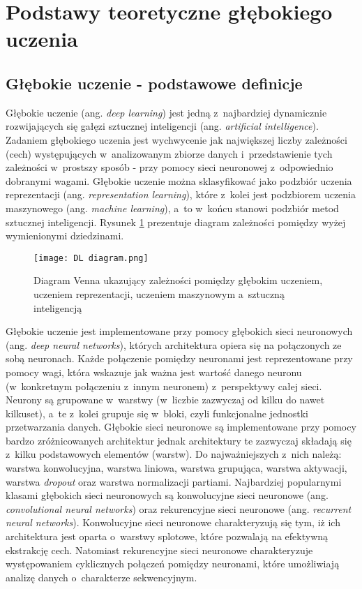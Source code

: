 \section{Podstawy teoretyczne głębokiego uczenia}

\subsection{Głębokie uczenie - podstawowe definicje}

Głębokie uczenie (ang. \emph{deep learning}) jest jedną z~najbardziej dynamicznie rozwijających się gałęzi sztucznej inteligencji (ang. \emph{artificial intelligence}). Zadaniem głębokiego uczenia jest wychwycenie jak największej liczby zależności (cech) występujących w~analizowanym zbiorze danych i~przedstawienie tych zależności w~prostszy sposób - przy pomocy sieci neuronowej z~odpowiednio dobranymi wagami. Głębokie uczenie można sklasyfikować jako podzbiór uczenia reprezentacji (ang. \emph{representation learning}), które z~kolei jest podzbiorem uczenia maszynowego (ang. \emph{machine learning}), a~to w~końcu stanowi podzbiór metod sztucznej inteligencji. Rysunek \ref{fig:diagram1} prezentuje diagram zależności pomiędzy wyżej wymienionymi dziedzinami.

\begin{figure}[!h]
    \centering \texttt{[image: DL diagram.png]}
    \captionsetup{format=hang}
    \caption{Diagram Venna ukazujący zależności pomiędzy głębokim uczeniem, uczeniem reprezentacji, uczeniem maszynowym a~sztuczną inteligencją \cite{goodfellow}}
    \label{fig:diagram1}
\end{figure}

Głębokie uczenie jest implementowane przy pomocy głębokich sieci neuronowych (ang. \emph{deep neural networks}), których architektura opiera się na połączonych ze sobą neuronach. Każde połączenie pomiędzy neuronami jest reprezentowane przy pomocy wagi, która wskazuje jak ważna jest wartość danego neuronu (w~konkretnym połączeniu z~innym neuronem) z~perspektywy całej sieci. Neurony są grupowane w~warstwy (w~liczbie zazwyczaj od kilku do nawet kilkuset), a~te z~kolei grupuje się w~bloki, czyli funkcjonalne jednostki przetwarzania danych. Głębokie sieci neuronowe są implementowane przy pomocy bardzo zróżnicowanych architektur jednak architektury te zazwyczaj składają się z~kilku podstawowych elementów (warstw). Do najważniejszych z~nich należą: warstwa konwolucyjna, warstwa liniowa, warstwa grupująca, warstwa aktywacji, warstwa \emph{dropout} oraz warstwa normalizacji partiami. Najbardziej popularnymi klasami głębokich sieci neuronowych są konwolucyjne sieci neuronowe (ang. \emph{convolutional neural networks}) oraz rekurencyjne sieci neuronowe (ang. \emph{recurrent neural networks}). Konwolucyjne sieci neuronowe charakteryzują się tym, iż ich architektura jest oparta o~warstwy splotowe, które pozwalają na efektywną ekstrakcję cech. Natomiast rekurencyjne sieci neuronowe charakteryzuje występowaniem cyklicznych połączeń pomiędzy neuronami, które umożliwiają analizę danych o~charakterze sekwencyjnym. 


